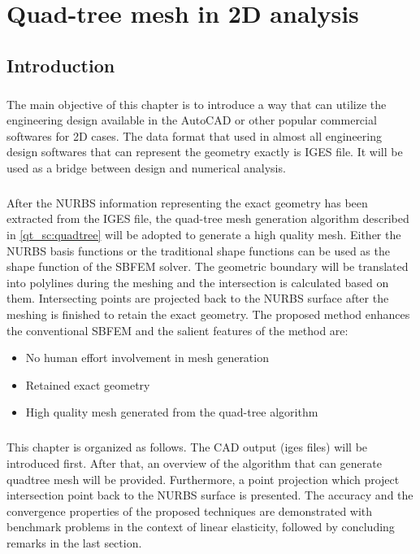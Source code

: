 \chapter{Quad-tree mesh in 2D analysis}
\label{qdt_sec:main}
\section{Introduction}
\paragraph{}
The main objective of this chapter is to introduce a way that can utilize the engineering design available in the AutoCAD or other popular commercial softwares for 2D cases.
The data format that used in almost all engineering design softwares that can represent the geometry exactly is IGES file.
It will be used as a bridge between design and numerical analysis.
%
\paragraph{}
After the NURBS information representing the exact geometry has been extracted from the IGES file, the quad-tree mesh generation algorithm described in \ref{qt_sc:quadtree} will be adopted to generate a high quality mesh.
Either the NURBS basis functions or the traditional shape functions can be used as the shape function of the SBFEM solver.
The geometric boundary will be translated into polylines during the meshing and the intersection is calculated based on them.
Intersecting points are projected back to the NURBS surface after the meshing is finished to retain the exact geometry.
The proposed method enhances the conventional SBFEM and the salient features of the method are:
    \begin{itemize}
        \item No human effort involvement in mesh generation
        \item Retained exact geometry
        \item High quality mesh generated from the quad-tree algorithm
    \end{itemize}
\paragraph{}
This chapter is organized as follows.
The CAD output (iges files) will be introduced first.
After that, an overview of the algorithm that can generate quadtree mesh will be provided.
Furthermore, a point projection which project intersection point back to the NURBS surface is presented.
The accuracy and the convergence properties of the proposed techniques are demonstrated with benchmark problems in the context of linear elasticity, followed by concluding remarks in the last section.


